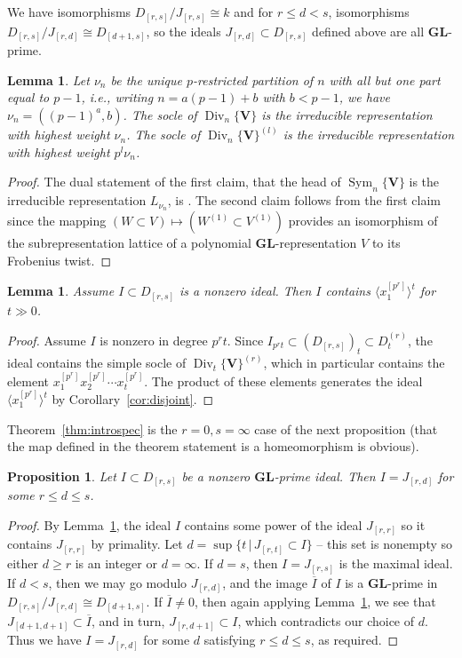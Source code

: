 \documentclass[12pt]{amsart}
\newcommand{\bV}{\mathbf{V}}
\DeclareMathOperator{\Div}{Div}
\DeclareMathOperator{\Sym}{Sym}
\newcommand{\Dr}{D^{(r)}}
\newcommand{\Drs}{D_{[r,s]}}
\newcommand{\Jrd}{J_{[r,d]}}
\newcommand{\Jrr}{J_{[r,r]}}
\newcommand{\GL}{\mathbf{GL}}
\numberwithin{equation}{section}
\newtheorem{proposition}[equation]{Proposition}
\newtheorem{lemma}[equation]{Lemma}
\theoremstyle{definition}
\theoremstyle{plain}
\begin{document}
We have isomorphisms $\Drs/J_{[r,s]} \cong k$ and for $r \leq d < s$, isomorphisms $\Drs/\Jrd \cong D_{[d+1, s]}$, so the ideals $\Jrd \subset \Drs$ defined above are all $\GL$-prime. 


\begin{lemma}\label{lem:socle}
    Let $\nu_n$ be the unique $p$-restricted partition of $n$ with all but one part equal to $p-1$, i.e., writing $n = a (p-1) + b$ with $b < p-1$, we have $\nu_n = ((p-1)^a, b)$.
    The socle of $\Div_n\{\bV\}$ is the irreducible representation with highest weight $\nu_n$. The socle of $\Div_n\{\bV\}^{(l)}$ is the irreducible representation with highest weight $p^l \nu_n$.
\end{lemma}
\begin{proof}
    The dual statement of the first claim, that the head of $\Sym_n\{\bV\}$ is the irreducible representation $L_{\nu_n}$, is \cite[Corollary~2.10]{perl26ide}. The second claim follows from the first claim
    since the mapping $(W \subset V) \mapsto (W^{(1)} \subset V^{(1)})$ provides an isomorphism of the subrepresentation lattice of a polynomial $\GL$-representation $V$ to its Frobenius twist.
\end{proof}

\begin{lemma}\label{lem:Dideals}
    Assume $I \subset \Drs$ is a nonzero ideal. Then $I$ contains $\langle x_1^{[p^r]} \rangle^t$ for $t \gg 0$. 
\end{lemma}
\begin{proof}
Assume $I$ is nonzero in degree $p^r t$. Since $I_{p^rt} \subset (\Drs)_t \subset \Dr_t$, the ideal contains the simple socle of $\Div_t\{\bV\}^{(r)}$, which in particular contains the element $x_1^{[p^r]} x_2^{[p^r]} \cdots x_t^{[p^r]}$. The product of these elements generates the ideal $ \langle x_1^{[p^r]} \rangle^t$ by Corollary~\ref{cor:disjoint}.
\end{proof}

Theorem~\ref{thm:introspec} is the $r = 0, s=\infty$ case of the next proposition (that the map defined in the theorem statement is a homeomorphism is obvious).

\begin{proposition}\label{prop:spectrum}
Let $I \subset \Drs$ be a nonzero $\GL$-prime ideal. Then $I = \Jrd$ for some $r \leq d \leq s$.
\end{proposition}
\begin{proof}
   By Lemma~\ref{lem:Dideals}, the ideal $I$ contains some power of the ideal $\Jrr$ so it contains $\Jrr$ by primality. Let $d = \sup\{t \,|\, J_{[r,t]} \subset I \}$ -- this set is nonempty so either $d \geq r$ is an integer or $d = \infty$. 
   If $d = s$, then $I = J_{[r,s]}$ is the maximal ideal. If $d < s$, then we may go modulo $\Jrd$, and the image $\overline{I}$ of $I$ is a $\GL$-prime in $\Drs/\Jrd \cong D_{[d+1, s]}$. If $\overline{I} \ne 0$, then again applying Lemma~\ref{lem:Dideals}, we see that $J_{[d+1, d+1]} \subset \overline{I}$, and in turn, $J_{[r, d+1]} \subset I$, which contradicts our choice of $d$. Thus we have $I = \Jrd$ for some $d$ satisfying $r \leq d \leq s$, as required. 
\end{proof}
\end{document}
